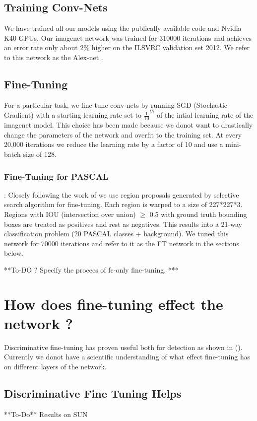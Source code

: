 \documentclass[runningheads]{llncs}
\begin{document}
\subsection{Training Conv-Nets}
\label{sub:train}
We have trained all our models using the publically available code \cite{caffe} and Nvidia K40 GPUs. Our imagenet network was trained for 310000 iterations and achieves an error rate only about 2\% higher on the ILSVRC validation set 2012. We refer to this network as the Alex-net .

\subsection{Fine-Tuning}
\label{sub:fine-train}
For a particular task, we fine-tune conv-nets by running SGD (Stochastic Gradient) with a starting learning rate set to $\frac{1}{10}^{th}$ of the intial learning rate of the imagenet model. This choice has been made because we donot want to drastically change the parameters of the network and overfit to the training set. At every 20,000 iterations we reduce the learning rate by a factor of 10 and use a mini-batch size of 128.

\subsubsection{Fine-Tuning for PASCAL}: Closely following the work of \cite{rcnn} we use region proposals generated by selective search algorithm for fine-tuning. Each region is warped to a size of 227*227*3. Regions with IOU (intersection over union) $\geq$ 0.5 with ground truth bounding boxes are treated as positives and rest as negatives. This  results into a 21-way classification problem (20 PASCAL classes + background). We tuned this network for 70000 iterations and refer to it as the FT network in the sections below.

**To-DO ? Specify the procees of fc-only fine-tuning.  ***



\section{How does fine-tuning effect the network ?}
Discriminative fine-tuning has proven useful both for detection as shown in (\cite{Rcnn}). Currently we donot have a scientific understanding of what effect fine-tuning has on different layers of the network.


\subsection{Discriminative Fine Tuning Helps}
**To-Do** Results on SUN
\end{document}
